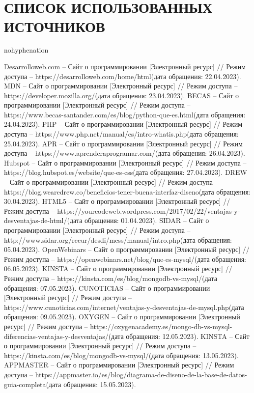 \newsection
\setcounter{figure}{0}\setcounter{table}{0}
\section*{СПИСОК ИСПОЛЬЗОВАННЫХ ИСТОЧНИКОВ}

\begin{hyphenrules}{nohyphenation} %
  \begin{thebibliography}{9}

     Desarrolloweb.com – Сайт о программировании [Электронный ресурс] // Режим доступа – https://desarrolloweb.com/home/html(дата обращения: 22.04.2023).
     MDN – Сайт о программировании [Электронный ресурс] // Режим доступа – https://developer.mozilla.org/(дата обращения: 23.04.2023).
     BECAS – Сайт о программировании [Электронный ресурс] // Режим доступа – https://www.becas-santander.com/es/blog/python-que-es.html(дата обращения: 24.04.2023).
     PHP – Сайт о программировании [Электронный ресурс] // Режим доступа – https://www.php.net/manual/es/intro-whatis.php(дата обращения: 25.04.2023).
     APR – Сайт о программировании [Электронный ресурс] // Режим доступа – https://www.aprenderaprogramar.com/(дата обращения: 26.04.2023).
     Hubspot – Сайт о программировании [Электронный ресурс] // Режим доступа – https://blog.hubspot.es/website/que-es-css(дата обращения: 27.04.2023).
     DREW – Сайт о программировании [Электронный ресурс] // Режим доступа – https://blog.wearedrew.co/beneficios-tener-buena-interfaz-diseno(дата обращения: 30.04.2023).
    	HTML5 – Сайт о программировании [Электронный ресурс] // Режим доступа – https://yourcodeweb.wordpress.com/2017/02/22/ventajas-y-desventajas-de-html/(дата обращения: 01.04.2023).
	 SIDAR – Сайт о программировании [Электронный ресурс] // Режим доступа – http://www.sidar.org/recur/desdi/mcss/manual/intro.php(дата обращения: 05.04.2023).
	 OpenWebinars – Сайт о программировании [Электронный ресурс] // Режим доступа – https://openwebinars.net/blog/que-es-mysql/(дата обращения: 06.05.2023).
	 KINSTA – Сайт о программировании [Электронный ресурс] // Режим доступа – https://kinsta.com/es/blog/mongodb-vs-mysql/(дата обращения: 07.05.2023).
	 CUNOTICIAS – Сайт о программировании [Электронный ресурс] // Режим доступа – https://www.cunoticias.com/internet/ventajas-y-desventajas-de-mysql.php(дата обращения: 09.05.2023).
	 OXYGEN – Сайт о программировании [Электронный ресурс] // Режим доступа – https://oxygenacademy.es/mongo-db-vs-mysql-diferencias-ventajas-y-desventajas/(дата обращения: 12.05.2023).
	 KINSTA – Сайт о программировании [Электронный ресурс] // Режим доступа – https://kinsta.com/es/blog/mongodb-vs-mysql/(дата обращения: 13.05.2023).
	 APPMASTER – Сайт о программировании [Электронный ресурс] // Режим доступа – https://appmaster.io/es/blog/diagrama-de-diseno-de-la-base-de-datos-guia-completa(дата обращения: 15.05.2023).
	
  \end{thebibliography}
\end{hyphenrules}
